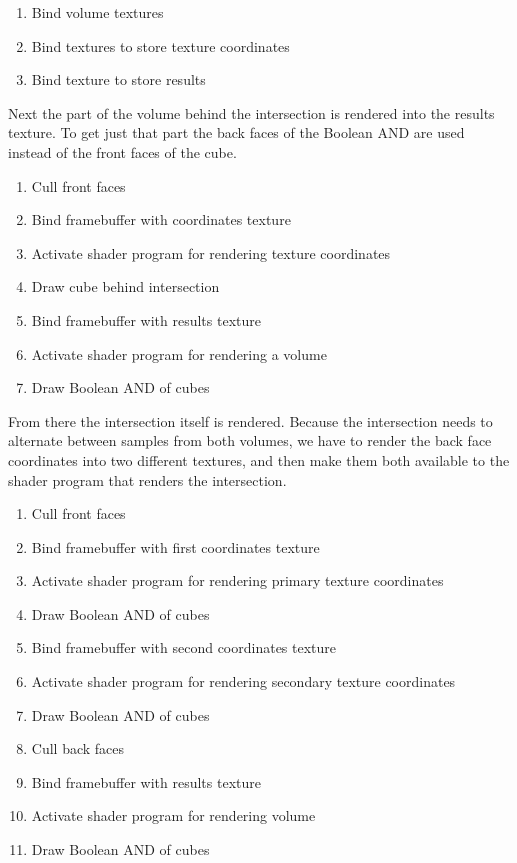 \documentclass{report}
\begin{document}
\begin{enumerate}
  \item Bind volume textures
  \item Bind textures to store texture coordinates
  \item Bind texture to store results
\end{enumerate}

Next the part of the volume behind the intersection is rendered into the results
texture.  To get just that part the back faces of the Boolean AND are used
instead of the front faces of the cube.

\begin{enumerate}
  \item Cull front faces
  \item Bind framebuffer with coordinates texture
  \item Activate shader program for rendering texture coordinates
  \item Draw cube behind intersection
  \item Bind framebuffer with results texture
  \item Activate shader program for rendering a volume
  \item Draw Boolean AND of cubes
\end{enumerate}

From there the intersection itself is rendered.  Because the intersection needs
to alternate between samples from both volumes, we have to render the back face
coordinates into two different textures, and then make them both available to
the shader program that renders the intersection.

\begin{enumerate}
  \item Cull front faces
  \item Bind framebuffer with first coordinates texture
  \item Activate shader program for rendering primary texture coordinates
  \item Draw Boolean AND of cubes
  \item Bind framebuffer with second coordinates texture
  \item Activate shader program for rendering secondary texture coordinates
  \item Draw Boolean AND of cubes
  \item Cull back faces
  \item Bind framebuffer with results texture
  \item Activate shader program for rendering volume
  \item Draw Boolean AND of cubes
\end{enumerate}
\end{document}
